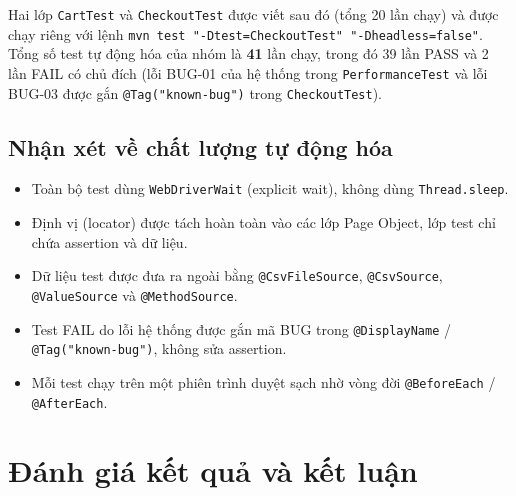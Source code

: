 \documentclass[12pt,a4paper]{article}
\begin{document}
Hai lớp \texttt{CartTest} và \texttt{CheckoutTest} được viết sau đó (tổng 20 lần chạy) và được
chạy riêng với lệnh \texttt{mvn test "-Dtest=CheckoutTest" "-Dheadless=false"}. Tổng số test tự
động hóa của nhóm là \textbf{41} lần chạy, trong đó 39 lần PASS và 2 lần FAIL có chủ đích
(lỗi BUG-01 của hệ thống trong \texttt{PerformanceTest} và lỗi BUG-03 được gắn
\texttt{@Tag("known-bug")} trong \texttt{CheckoutTest}).

\subsection{Nhận xét về chất lượng tự động hóa}
\begin{itemize}[label=\textcolor{passgreen}{}]
    \item Toàn bộ test dùng \texttt{WebDriverWait} (explicit wait), không dùng \texttt{Thread.sleep}.
    \item Định vị (locator) được tách hoàn toàn vào các lớp Page Object, lớp test chỉ chứa assertion và dữ liệu.
    \item Dữ liệu test được đưa ra ngoài bằng \texttt{@CsvFileSource}, \texttt{@CsvSource}, \texttt{@ValueSource} và \texttt{@MethodSource}.
    \item Test FAIL do lỗi hệ thống được gắn mã BUG trong \texttt{@DisplayName} / \texttt{@Tag("known-bug")}, không sửa assertion.
    \item Mỗi test chạy trên một phiên trình duyệt sạch nhờ vòng đời \texttt{@BeforeEach} / \texttt{@AfterEach}.
\end{itemize}

\section{Đánh giá kết quả và kết luận}
\end{document}
